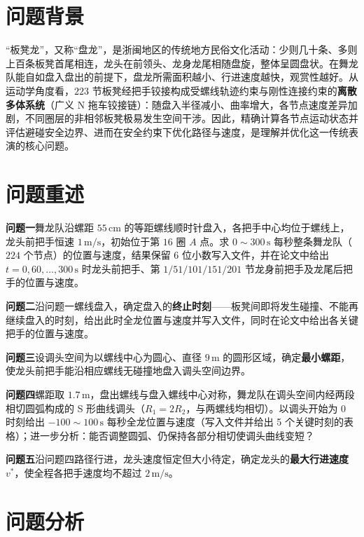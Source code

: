 ﻿\documentclass{cumcmthesis}
\begin{document}

\section{问题背景}

“板凳龙”，又称“盘龙”，是浙闽地区的传统地方民俗文化活动：少则几十条、多则上百条板凳首尾相连，龙头在前领头、龙身龙尾相随盘旋，整体呈圆盘状。在舞龙队能自如盘入盘出的前提下，盘龙所需面积越小、行进速度越快，观赏性越好。从运动学角度看，$223$ 节板凳经把手铰接构成受螺线轨迹约束与刚性连接约束的\textbf{离散多体系统}（广义 N 拖车铰接链）：随盘入半径减小、曲率增大，各节点速度差异加剧，不同圈层的非相邻板凳极易发生空间干涉。因此，精确计算各节点运动状态并评估避碰安全边界、进而在安全约束下优化路径与速度，是理解并优化这一传统表演的核心问题。

\section{问题重述}

\textbf{问题一}\quad 舞龙队沿螺距 $55\,\text{cm}$ 的等距螺线顺时针盘入，各把手中心均位于螺线上，龙头前把手恒速 $1\,\text{m/s}$，初始位于第 $16$ 圈 $A$ 点。求 $0\sim300\,\text{s}$ 每秒整条舞龙队（$224$ 个节点）的位置与速度，结果保留 6 位小数写入文件，并在论文中给出 $t=0,60,\dots,300\,\text{s}$ 时龙头前把手、第 $1/51/101/151/201$ 节龙身前把手及龙尾后把手的位置与速度。

\textbf{问题二}\quad 沿问题一螺线盘入，确定盘入的\textbf{终止时刻}——板凳间即将发生碰撞、不能再继续盘入的时刻，给出此时全龙位置与速度并写入文件，同时在论文中给出各关键把手的位置与速度。

\textbf{问题三}\quad 设调头空间为以螺线中心为圆心、直径 $9\,\text{m}$ 的圆形区域，确定\textbf{最小螺距}，使龙头前把手能沿相应螺线无碰撞地盘入调头空间边界。

\textbf{问题四}\quad 螺距取 $1.7\,\text{m}$，盘出螺线与盘入螺线中心对称，舞龙队在调头空间内经两段相切圆弧构成的 S 形曲线调头（$R_1=2R_2$，与两螺线均相切）。以调头开始为 $0$ 时刻给出 $-100\sim100\,\text{s}$ 每秒全龙位置与速度（写入文件并给出 5 个关键时刻的表格）；进一步分析：能否调整圆弧、仍保持各部分相切使调头曲线变短？

\textbf{问题五}\quad 沿问题四路径行进，龙头速度恒定但大小待定，确定龙头的\textbf{最大行进速度} $v^{*}$，使全程各把手速度均不超过 $2\,\text{m/s}$。

\section{问题分析}
\end{document}
